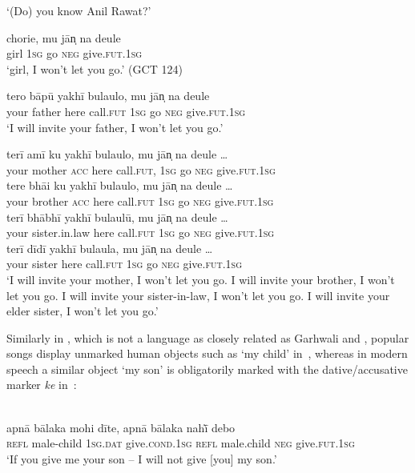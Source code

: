 \documentclass[output=paper]{LSP/langsci}
\begin{document}
\glt ‘(Do) you know Anil Rawat?’
\z

\ea \label{10-mo-ex:54}

\ea \label{10-mo-ex:54a}
\gll chorie, mu jān̩ na deule\\
 girl \textsc{1sg} go \textsc{neg} give.\textsc{fut.1sg}\\
 \glt ‘girl, I won’t let you go.’  (GCT 124)

\ex \label{10-mo-ex:54b}
\gll tero bāpū yakhī bulaulo, mu jān̩ na deule\\
 your father here call.\textsc{fut} \textsc{1sg} go \textsc{neg} give.\textsc{fut.1sg}\\
 \glt ‘I will invite your father, I won’t let you go.’

\ex \label{10-mo-ex:54c}
\gll terī amī ku yakhī bulaulo, mu jān̩ na deule  …\\
 your mother \textsc{acc} here call.\textsc{fut}, \textsc{1sg} go \textsc{neg} give.\textsc{fut.1sg}\\

\ex \label{10-mo-ex:54d}
\gll tere bhāi ku yakhī bulaulo, mu jān̩ na deule …\\
 your brother \textsc{acc} here call.\textsc{fut} \textsc{1sg} go \textsc{neg} give.\textsc{fut.1sg}\\

\ex \label{10-mo-ex:54e}
\gll terī bhābhī yakhī bulaulū, mu jān̩ na deule …\\
 your sister.in.law here call.\textsc{fut} \textsc{1sg} go \textsc{neg} give.\textsc{fut.1sg}\\

\ex \label{10-mo-ex:54f}
\gll terī dīdī yakhī bulaula, mu jān̩ na deule …\\
 your sister here call.\textsc{fut} \textsc{1sg} go \textsc{neg} give.\textsc{fut.1sg}\\
\glt ‘I will invite your mother, I won’t let you go. I will invite your brother, I won’t let you go. I will invite your sister-in-law, I won’t let you go. I will invite your elder sister, I won’t let you go.’
\z
\z


Similarly in , which is not a language as closely related as Garhwali and , popular songs display unmarked human objects such as ‘my child’ in~, whereas in modern speech a similar object ‘my son’ is obligatorily marked with the dative/accusative marker \textit{ke} in~:

\ea {} \citep{Saxena1937Evolution}\\
\label{10-mo-ex:55}
\ea \label{10-mo-ex:55a}
\gll apnā bālaka mohi dīte, apnā bālaka nahī̃ debo\\
\textsc{refl} male-child \textsc{1sg.dat} give.\textsc{cond.1sg} \textsc{refl} male.child \textsc{neg} give.\textsc{fut.1sg}\\
\glt ‘If you give me your son – I will not give [you] my son.’
\end{document}
